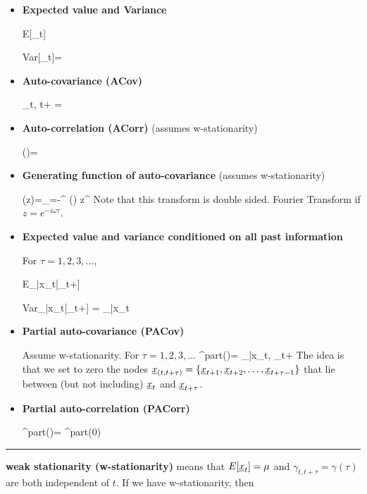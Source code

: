 \begin{itemize}

\item {\bf Expected value and Variance}

\beq
E[\rvx_t]
\eeq

\beq
Var[\rvx_t]=
\eeq

\item{\bf Auto-covariance (ACov)}

\beq
\gamma_{t, t+\tau}
=
\eeq




\item{\bf Auto-correlation (ACorr)} (assumes
w-stationarity)

\beq
\rho(\tau)=
\eeq

\item {\bf Generating function 
of auto-covariance} (assumes w-stationarity)


\beq
\tilde{\gamma}(z)=\sum_{\tau=-\infty}^{\infty}
\gamma(\tau) z^\tau
\eeq
Note that this transform is double sided.
Fourier Transform 
if $z=e^{-i\omega\tau}$.

\item{\bf Expected value 
and variance conditioned on all past information}

For $\tau=1,2, 3, \dots$,

\beq
E_{|x_{\leq t}}[\rvx_{t+\tau}]
\eeq

\beq
Var_{|x_{\leq t}}[\rvx_{t+\tau}]
=
_{|x_{\leq t}}
\eeq

\item {\bf Partial auto-covariance (PACov)}

Assume w-stationarity.
For $\tau=1,2,3, \ldots$
\beq
\gamma^{part}(\tau)=
_{|x_{\leq t}, \rvx_{t+\tau}}
\eeq
The idea is that we set to zero the
nodes ${\underline{x}}_{(t, t+\tau)}=
\{{\underline{x}}_{t+1}, {\underline{x}}_{t+2}, \ldots,{\underline{x}}_{t+\tau-1}\}$ 
that lie
between 
(but not including) ${\underline{x}}_t$ and ${\underline{x}}_{t+\tau}$.

\item {\bf Partial auto-correlation (PACorr)}


\beq
\rho^{part}(\tau)=
{\gamma^{part}(0)}
\eeq
\end{itemize}


\hrule

{\bf weak stationarity (w-stationarity)}
means that
$E[{\underline{x}}_t]=\mu$ 
and 
$\gamma_{t, t+\tau}=\gamma(\tau)$
are both independent of $t$.
If we have w-stationarity, 
then

